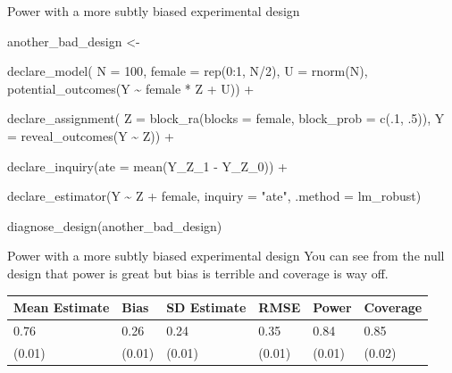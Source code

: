 \documentclass[
  11pt,
  ignorenonframetext,
]{beamer}
\newenvironment{Shaded}{\begin{snugshade}}{\end{snugshade}}
\newcommand{\AttributeTok}[1]{\textcolor[rgb]{0.40,0.45,0.13}{#1}}
\newcommand{\DecValTok}[1]{\textcolor[rgb]{0.68,0.00,0.00}{#1}}
\newcommand{\FunctionTok}[1]{\textcolor[rgb]{0.28,0.35,0.67}{#1}}
\newcommand{\NormalTok}[1]{\textcolor[rgb]{0.00,0.23,0.31}{#1}}
\newcommand{\OtherTok}[1]{\textcolor[rgb]{0.00,0.23,0.31}{#1}}
\newcommand{\SpecialCharTok}[1]{\textcolor[rgb]{0.37,0.37,0.37}{#1}}
\newcommand{\StringTok}[1]{\textcolor[rgb]{0.13,0.47,0.30}{#1}}
\begin{document}
\begin{frame}[fragile]{Power with a more subtly biased experimental
design}
\protect\hypertarget{power-with-a-more-subtly-biased-experimental-design}{}
\begin{Shaded}
\begin{Highlighting}[]
\NormalTok{another\_bad\_design }\OtherTok{\textless{}{-}} 
  
  \FunctionTok{declare\_model}\NormalTok{(}
    \AttributeTok{N =} \DecValTok{100}\NormalTok{, }
    \AttributeTok{female =} \FunctionTok{rep}\NormalTok{(}\DecValTok{0}\SpecialCharTok{:}\DecValTok{1}\NormalTok{, N}\SpecialCharTok{/}\DecValTok{2}\NormalTok{),}
    \AttributeTok{U =} \FunctionTok{rnorm}\NormalTok{(N),}
    \FunctionTok{potential\_outcomes}\NormalTok{(Y }\SpecialCharTok{\textasciitilde{}}\NormalTok{ female }\SpecialCharTok{*}\NormalTok{ Z }\SpecialCharTok{+}\NormalTok{ U)) }\SpecialCharTok{+} 
  
  \FunctionTok{declare\_assignment}\NormalTok{(}
    \AttributeTok{Z =} \FunctionTok{block\_ra}\NormalTok{(}\AttributeTok{blocks =}\NormalTok{ female, }\AttributeTok{block\_prob =} \FunctionTok{c}\NormalTok{(.}\DecValTok{1}\NormalTok{, .}\DecValTok{5}\NormalTok{)),}
    \AttributeTok{Y =} \FunctionTok{reveal\_outcomes}\NormalTok{(Y }\SpecialCharTok{\textasciitilde{}}\NormalTok{ Z)) }\SpecialCharTok{+} 

  \FunctionTok{declare\_inquiry}\NormalTok{(}\AttributeTok{ate =} \FunctionTok{mean}\NormalTok{(Y\_Z\_1 }\SpecialCharTok{{-}}\NormalTok{ Y\_Z\_0)) }\SpecialCharTok{+} 
  
  \FunctionTok{declare\_estimator}\NormalTok{(Y }\SpecialCharTok{\textasciitilde{}}\NormalTok{ Z }\SpecialCharTok{+}\NormalTok{ female, }\AttributeTok{inquiry =} \StringTok{"ate"}\NormalTok{, }
                    \AttributeTok{.method =}\NormalTok{ lm\_robust)}
\end{Highlighting}
\end{Shaded}

\begin{Shaded}
\begin{Highlighting}[]
  \FunctionTok{diagnose\_design}\NormalTok{(another\_bad\_design)}
\end{Highlighting}
\end{Shaded}
\end{frame}

\begin{frame}{Power with a more subtly biased experimental design}
\protect\hypertarget{power-with-a-more-subtly-biased-experimental-design-1}{}
You can see from the null design that power is great but bias is
terrible and coverage is way off.

\begin{tabular}{l|l|l|l|l|l}
\hline
Mean Estimate & Bias & SD Estimate & RMSE & Power & Coverage\\
\hline
0.76 & 0.26 & 0.24 & 0.35 & 0.84 & 0.85\\
\hline
(0.01) & (0.01) & (0.01) & (0.01) & (0.01) & (0.02)\\
\hline
\end{tabular}
\end{frame}
\end{document}
